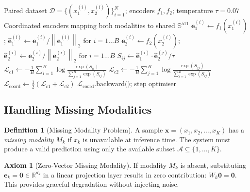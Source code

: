 \documentclass[12pt,a4paper]{article}
\theoremstyle{definition}
\newtheorem{definition}{Definition}[section]
\newtheorem{axiom}{Axiom}[section]
\theoremstyle{plain}
\theoremstyle{remark}
\newcommand{\R}{\mathbb{R}}
\newcommand{\Sph}{\mathbb{S}}
\newcommand{\Norm}[1]{\left\|#1\right\|_2}
\begin{document}
\begin{algorithm}[H]
\caption{Coordinated Representation Learning (Symmetric Contrastive)}
\label{alg:coord_repr}
\begin{algorithmic}[1]
\Require Paired dataset $\mathcal{D} = \{(x_1^{(i)}, x_2^{(i)})\}_{i=1}^N$; encoders $f_1, f_2$; temperature $\tau = 0.07$
\Ensure Coordinated encoders mapping both modalities to shared $\Sph^{511}$
  \State $\mathbf{e}_1^{(i)} \gets f_1(x_1^{(i)})$; $\hat{\mathbf{e}}_1^{(i)} \gets \mathbf{e}_1^{(i)}/\Norm{\mathbf{e}_1^{(i)}}$ for $i=1\ldots B$
  \State $\mathbf{e}_2^{(i)} \gets f_2(x_2^{(i)})$; $\hat{\mathbf{e}}_2^{(i)} \gets \mathbf{e}_2^{(i)}/\Norm{\mathbf{e}_2^{(i)}}$ for $i=1\ldots B$
  \State $S_{ij} \gets \hat{\mathbf{e}}_1^{(i)} \cdot \hat{\mathbf{e}}_2^{(j)} / \tau$ 
  \State $\mathcal{L}_{c1} \gets -\frac{1}{B}\sum_{i=1}^B\log\frac{\exp(S_{ii})}{\sum_{j=1}^B \exp(S_{ij})}$
  \State $\mathcal{L}_{c2} \gets -\frac{1}{B}\sum_{j=1}^B\log\frac{\exp(S_{jj})}{\sum_{i=1}^B \exp(S_{ij})}$
  \State $\mathcal{L}_{\text{coord}} \gets \frac{1}{2}(\mathcal{L}_{c1} + \mathcal{L}_{c2})$
  \State $\mathcal{L}_{\text{coord}}.\text{backward()}$; step optimiser
\EndFor
\end{algorithmic}
\end{algorithm}

\subsection{Handling Missing Modalities}

\begin{definition}[Missing Modality Problem]
A sample $\mathbf{x} = (x_1, x_2, \ldots, x_K)$ has a \emph{missing modality} $M_k$ if $x_k$ is unavailable at inference time. The system must produce a valid prediction using only the available subset $\mathcal{A} \subseteq \{1,\ldots,K\}$.
\end{definition}

\begin{axiom}[Zero-Vector Missing Modality]
\label{ax:missing}
If modality $M_k$ is absent, substituting $\mathbf{e}_k = \bm{0} \in \R^{d_k}$ in a linear projection layer results in zero contribution: $W_k \bm{0} = \bm{0}$. This provides graceful degradation without injecting noise.
\end{axiom}
\end{document}
